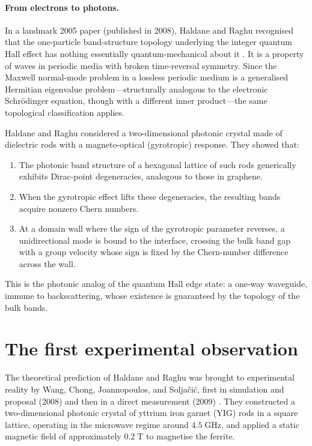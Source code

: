 \paragraph{From electrons to photons.}
In a landmark 2005 paper (published in 2008), Haldane and Raghu
recognised that the one-particle band-structure topology underlying the
integer quantum Hall effect has nothing essentially quantum-mechanical
about it \cite{haldane2008possible}.  It is a property of waves in
periodic media with broken time-reversal symmetry.  Since the
Maxwell normal-mode problem in a lossless periodic medium is a
generalised Hermitian eigenvalue problem---structurally analogous to the
electronic Schr\"odinger equation, though with a different inner
product---the same topological classification applies.

Haldane and Raghu considered a two-dimensional photonic crystal made of
dielectric rods with a magneto-optical (gyrotropic) response.  They
showed that:
\begin{enumerate}[label=(\roman*)]
  \item The photonic band structure of a hexagonal lattice of such rods
        generically exhibits Dirac-point degeneracies, analogous to
        those in graphene.
  \item When the gyrotropic effect lifts these degeneracies, the
        resulting bands acquire nonzero Chern numbers.
  \item At a domain wall where the sign of the gyrotropic parameter
        reverses, a unidirectional mode is bound to the interface,
        crossing the bulk band gap with a group velocity whose sign is
        fixed by the Chern-number difference across the wall.
\end{enumerate}
This is the photonic analog of the quantum Hall edge state: a one-way
waveguide, immune to backscattering, whose existence is guaranteed by
the topology of the bulk bands.

\section{The first experimental observation}
\label{sec:ch1-wang-experiment}

The theoretical prediction of Haldane and Raghu was brought to
experimental reality by Wang, Chong, Joannopoulos, and
Solja\v{c}i\'{c}, first in simulation and proposal (2008) and then in a
direct measurement (2009) \cite{nature2026observation}.
They constructed a two-dimensional photonic crystal of yttrium iron
garnet (YIG) rods in a square lattice, operating in the microwave regime
around $4.5\;\mathrm{GHz}$, and applied a static magnetic field of
approximately $0.2\;\mathrm{T}$ to magnetise the ferrite.

